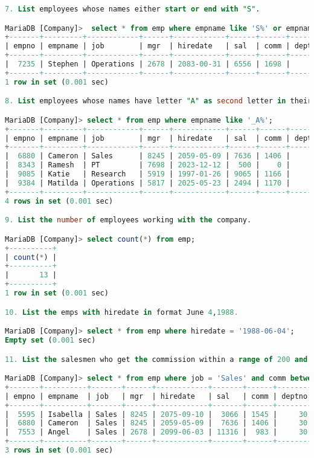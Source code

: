 \documentclass[11pt]{article}
\begin{document}
\begin{lstlisting}[language=SQL]
7. List employees whose names either start or end with "S".

MariaDB [Company]>  select * from emp where empname like 'S%' or empname like '%S';
+-------+---------+------------+------+------------+------+------+--------+
| empno | empname | job        | mgr  | hiredate   | sal  | comm | deptno |
+-------+---------+------------+------+------------+------+------+--------+
|  7235 | Stephen | Operations | 2678 | 2083-00-31 | 6556 | 1698 |     40 |
+-------+---------+------------+------+------------+------+------+--------+
1 row in set (0.001 sec)

8. List employees whose names have letter "A" as second letter in their names.

MariaDB [Company]> select * from emp where empname like '_A%';
+-------+---------+------------+------+------------+------+------+--------+
| empno | empname | job        | mgr  | hiredate   | sal  | comm | deptno |
+-------+---------+------------+------+------------+------+------+--------+
|  6880 | Cameron | Sales      | 8245 | 2059-05-09 | 7636 | 1406 |     30 |
|  8343 | Ramesh  | PT         | 7698 | 2023-12-12 |  500 |    0 |     60 |
|  9085 | Katie   | Research   | 5919 | 1997-01-26 | 9065 | 1166 |     20 |
|  9384 | Matilda | Operations | 5817 | 2025-05-23 | 2494 | 1170 |     40 |
+-------+---------+------------+------+------------+------+------+--------+
4 rows in set (0.001 sec)

9. List the number of employees working with the company.

MariaDB [Company]> select count(*) from emp;
+----------+
| count(*) |
+----------+
|       13 |
+----------+
1 row in set (0.001 sec)

10. List the emps with hiredate in format June 4,1988.

MariaDB [Company]> select * from emp where hiredate = '1988-06-04';
Empty set (0.001 sec)

11. List the salesmen who get the commission within a range of 200 and 5000.

MariaDB [Company]> select * from emp where job = 'Sales' and comm between 200 and 5000;
+-------+----------+-------+------+------------+-------+------+--------+
| empno | empname  | job   | mgr  | hiredate   | sal   | comm | deptno |
+-------+----------+-------+------+------------+-------+------+--------+
|  5595 | Isabella | Sales | 8245 | 2075-09-10 |  3066 | 1545 |     30 |
|  6880 | Cameron  | Sales | 8245 | 2059-05-09 |  7636 | 1406 |     30 |
|  7553 | Angel    | Sales | 2678 | 2099-06-03 | 11316 |  983 |     30 |
+-------+----------+-------+------+------------+-------+------+--------+
3 rows in set (0.001 sec)
	
\end{lstlisting}
\end{document}
